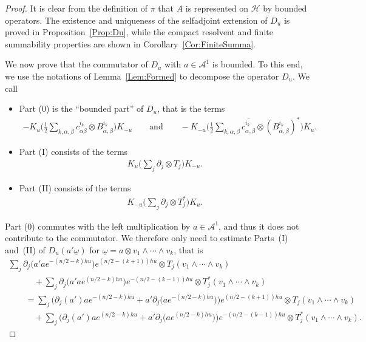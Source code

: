\documentclass[pdftex]{sigma}
\newcommand{\Aa}{\mathcal{A}}
\newcommand{\Hh}{\mathscr{H}}
\newcommand{\omegat}{\underline{\omega}}
\numberwithin{equation}{section}
\begin{document}
\begin{proof}
It is clear from the def\/inition of $\pi$ that $A$ is represented on $\Hh$ by bounded operators. The existence and uniqueness of the selfadjoint extension of $D_u$ is proved in Proposition~\ref{Prop:Du}, while the compact resolvent and f\/inite summability properties are shown in Corollary~\ref{Cor:FiniteSumma}.

We now prove that the commutator of $D_u$ with $a \in \Aa^1$ is bounded. To this end, we use the notations of Lemma~\ref{Lem:Formed} to decompose the operator $D_u$. We call
\begin{itemize}\itemsep=0pt
\item
Part (0) is the ``bounded part'' of $D_u$, that is the terms
\begin{gather*}
 - K_u \bigg( \frac{1}{2} \sum_{k,\alpha,\beta} c^{i_k}_{\alpha \beta} \otimes B^{i_k}_{\alpha,\beta} \bigg) K_{-u}
\qquad
\text{and}
\qquad
- K_{-u} \bigg( \frac{1}{2} \sum_{k,\alpha,\beta} \overline{c^{i_k}_{\alpha, \beta}} \otimes (B^{i_k}_{\alpha, \beta})^* \bigg) K_{u}.
\end{gather*}
\item
Part (I) consists of the terms
\begin{gather*}
K_u \bigg( \sum_{j} \partial _j \otimes T_j \bigg) K_{-u}.
\end{gather*}
\item
Part (II) consists of the terms
\begin{gather*}
K_{-u} \bigg( \sum_{j} \partial _j \otimes T_j^* \bigg) K_{u}.
\end{gather*}
\end{itemize}
Part (0) commutes with the left multiplication by $a \in \Aa^1$, and thus it does not contribute to the commutator. We therefore only need to estimate Parts~(I) and~(II) of $D_u( a' \omegat)$ for $\omegat = a \otimes v_1 \wedge \cdots \wedge v_k$, that is
\begin{gather*}
\sum_j \partial_j\big( a' a e^{-(n/2 - k)h u} \big) e^{(n/2 - (k+1))h u} \otimes T_j( v_1 \wedge \cdots \wedge v_k) \\
\qquad\quad{}
+ \sum_j \partial_j\big( a' a e^{(n/2 - k)h u} \big) e^{-(n/2 - (k-1))h u} \otimes T_j^*( v_1 \wedge \cdots \wedge v_k)\\
\qquad{}
= \sum_j \big(\partial_j( a') a e^{-(n/2 - k)h u} + a' \partial_j\big(a e^{-(n/2 - k)h u}\big)\big) e^{(n/2 - (k+1))h u}
\otimes T_j( v_1 \wedge \cdots \wedge v_k) \\
\qquad\quad{}
+ \sum_j \big(\partial_j( a') a e^{(n/2 - k)h u} + a' \partial_j\big(a e^{(n/2 - k)h u}\big)\big) e^{-(n/2 - (k-1))h u} \otimes T_j^*( v_1 \wedge \cdots \wedge v_k).

\end{gather*}
\end{proof}
\end{document}
